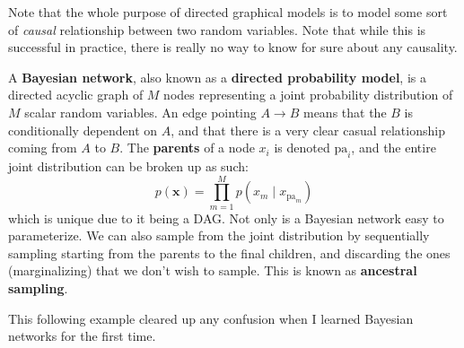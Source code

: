 \documentclass{article}
\begin{document}
  Note that the whole purpose of directed graphical models is to model some sort of \textit{causal} relationship between two random variables. Note that while this is successful in practice, there is really no way to know for sure about any causality. 

  \begin{definition}  
    A \textbf{Bayesian network}, also known as a \textbf{directed probability model}, is a directed acyclic graph of $M$ nodes representing a joint probability distribution of $M$ scalar random variables. An edge pointing $A \rightarrow B$ means that the $B$ is conditionally dependent on $A$, and that there is a very clear casual relationship coming from $A$ to $B$. The \textbf{parents} of a node $x_i$ is denoted $\mathrm{pa}_i$, and the entire joint distribution can be broken up as such: 
    \begin{equation}
      p(\mathbf{x}) = \prod_{m=1}^M p(x_m \mid x_{\mathrm{pa}_m})
    \end{equation}
    which is unique due to it being a DAG. Not only is a Bayesian network easy to parameterize. We can also sample from the joint distribution by sequentially sampling starting from the parents to the final children, and discarding the ones (marginalizing) that we don't wish to sample. This is known as \textbf{ancestral sampling}. 

    \begin{figure}[H]
      \centering 
      \caption{} 
      \label{fig:bayesian_network}
    \end{figure}
  \end{definition}

  This following example cleared up any confusion when I learned Bayesian networks for the first time. 
\end{document}
